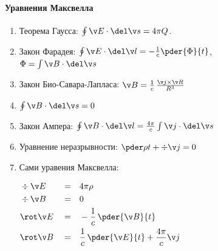 \documentclass{trchesh}
\begin{document}
\begin{multicols*}{3}\raggedright
\parindent=0pt
\paragraph{Уравнения Максвелла}
\begin{enumerate}
  \item Теорема Гаусса: $\oint \v E \cdot \del \v s = 4 \pi Q$.
  \item Закон Фарадея: $\oint\v E \cdot \del \v l = - \frac{1}{c} \pder{\Phi}{t}$, \\
    $\Phi=\int \v B \cdot \del \v s$
  \item Закон Био-Савара-Лапласа: $\v B = \frac{1}{c} \, \frac{\v j \times \v R}{R^3}$
  \item $\oint \v B \cdot \del \v s = 0$
  \item Закон Ампера: $\oint \v B \cdot \del \v l = \frac{4 \pi}{c} \int \v j \cdot \del \v s$
  \item Уравнение неразрывности: $\pder \rho t  + \div \v j = 0 $
  \item Сами уравения Максвелла: \par\vspace{1ex}$
    \begin{aligned}
      &\div \v E &&=&& 4 \pi \rho \\
      &\div \v B &&=&& 0 \\
      &\rot \v E &&=&& - \frac 1 c \, \pder{\v B}{t} \\
      &\rot \v B &&=&& \frac 1 c\, \pder{\v E}{t} + \frac{4 \pi}{c}\v j
    \end{aligned}$
\end{enumerate}


\end{multicols*}
\end{document}
